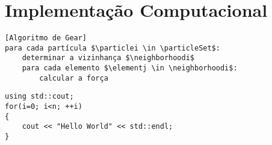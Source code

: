 \chapter{Implementação Computacional} \label{ch:computational_implementation}



\begin{lstlisting}[style=pseudocode, label=lst:equations_solution, caption=Solução das equações de movimento por meio do algoritmo de Gear]
[Algoritmo de Gear]
para cada partícula $\particlei \in \particleSet$:
	determinar a vizinhança $\neighborhoodi$
	para cada elemento $\elementj \in \neighborhoodi$:
		calcular a força
\end{lstlisting}

\begin{lstlisting}[style=C++]
using std::cout;
for(i=0; i<n; ++i)
{
	cout << "Hello World" << std::endl;
}
\end{lstlisting}